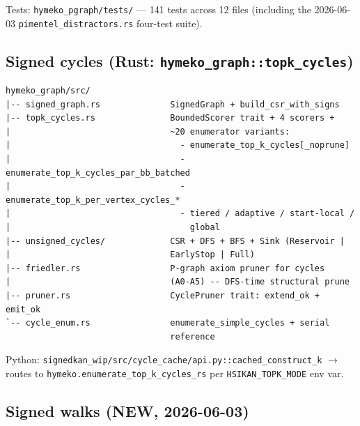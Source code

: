 \documentclass[11pt]{article}
\begin{document}
Tests: \texttt{hymeko\_pgraph/tests/} --- 141 tests across 12 files
(including the 2026-06-03
\texttt{pimentel\_distractors.rs} four-test suite).

\subsection{Signed cycles (Rust: \texttt{hymeko\_graph::topk\_cycles})}

\begin{lstlisting}
hymeko_graph/src/
|-- signed_graph.rs              SignedGraph + build_csr_with_signs
|-- topk_cycles.rs               BoundedScorer trait + 4 scorers +
|                                ~20 enumerator variants:
|                                  - enumerate_top_k_cycles[_noprune]
|                                  - enumerate_top_k_cycles_par_bb_batched
|                                  - enumerate_top_k_per_vertex_cycles_*
|                                  - tiered / adaptive / start-local /
|                                    global
|-- unsigned_cycles/             CSR + DFS + BFS + Sink (Reservoir |
|                                EarlyStop | Full)
|-- friedler.rs                  P-graph axiom pruner for cycles
|                                (A0-A5) -- DFS-time structural prune
|-- pruner.rs                    CyclePruner trait: extend_ok + emit_ok
`-- cycle_enum.rs                enumerate_simple_cycles + serial
                                 reference
\end{lstlisting}

Python: \texttt{signedkan\_wip/src/cycle\_cache/api.py::cached\_construct\_k}
$\to$ routes to \texttt{hymeko.enumerate\_top\_k\_cycles\_rs} per
\texttt{HSIKAN\_TOPK\_MODE} env var.

\subsection{Signed walks (NEW, 2026-06-03)}
\end{document}
